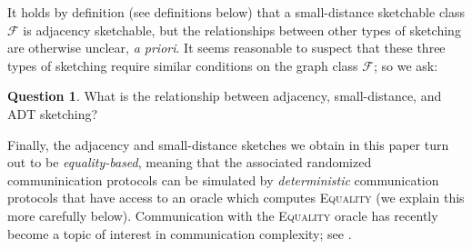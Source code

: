 \documentclass[11pt]{article}
\theoremstyle{definition}
\newtheorem{qn}{Question}
\def\F {{\mathcal F}}
\begin{document}
\noindent
It holds by definition (see definitions below) that a small-distance sketchable class $\F$ is
adjacency sketchable, but the relationships between other types of sketching are otherwise unclear,
\emph{a priori}. It seems reasonable to suspect that these three types of sketching require similar
conditions on the graph class $\F$; so we ask:
\noindent
\begin{qn}
\label{question:relationship}
What is the relationship between adjacency, small-distance, and ADT
sketching?
\end{qn}

Finally, the adjacency and small-distance sketches we obtain in this paper turn out to be
\emph{equality-based}, meaning that the associated randomized communinication protocols can be
simulated by \emph{deterministic} communication protocols that have access to an oracle which
computes \textsc{Equality} (we explain this more carefully below). Communication with the
\textsc{Equality} oracle has recently become a topic of interest in communication complexity; see
\cite{GPW18,CLV19,HHH21b,HWZ21,AY22,PSS23}.
\end{document}
